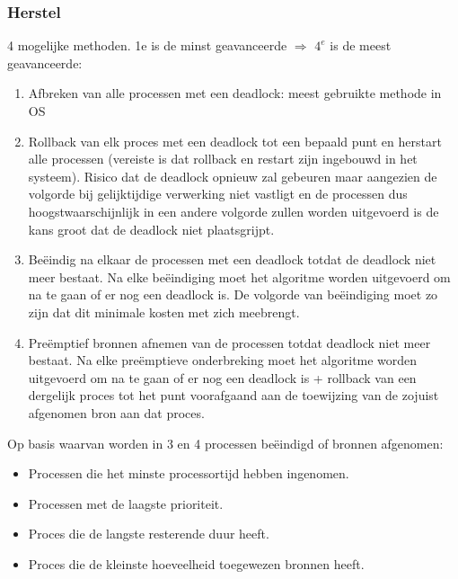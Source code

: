 \subsubsection{Herstel}

4 mogelijke methoden. 1e is de minst geavanceerde $\Rightarrow$
$4^e$ is de meest geavanceerde:

\begin{enumerate}
\item Afbreken van alle processen met een deadlock: meest gebruikte methode in OS
\item Rollback van elk proces met een deadlock tot een bepaald punt en herstart alle processen (vereiste is dat rollback en restart zijn ingebouwd in het systeem). Risico dat de deadlock opnieuw zal gebeuren maar aangezien de volgorde bij gelijktijdige verwerking niet vastligt en de processen dus hoogstwaarschijnlijk in een andere volgorde zullen worden uitgevoerd is de kans groot dat de deadlock niet plaatsgrijpt.
\item Beëindig na elkaar de processen met een deadlock totdat de deadlock niet meer bestaat. Na elke beëindiging moet het algoritme worden uitgevoerd om na te gaan of er nog een deadlock is. De volgorde van beëindiging moet zo zijn dat dit minimale kosten met zich meebrengt.
\item Preëmptief bronnen afnemen van de processen totdat deadlock niet meer bestaat. Na elke preëmptieve onderbreking moet het algoritme worden uitgevoerd om na te gaan of er nog een deadlock is + rollback van een dergelijk proces tot het punt voorafgaand aan de toewijzing van de zojuist afgenomen bron aan dat proces.
\end{enumerate}

Op basis waarvan worden in 3 en 4 processen beëindigd of bronnen afgenomen:

\begin{itemize}
\item Processen die het minste processortijd hebben ingenomen.
\item Processen met de laagste prioriteit.
\item Proces die de langste resterende duur heeft.
\item Proces die de kleinste hoeveelheid toegewezen bronnen heeft.
\end{itemize}

